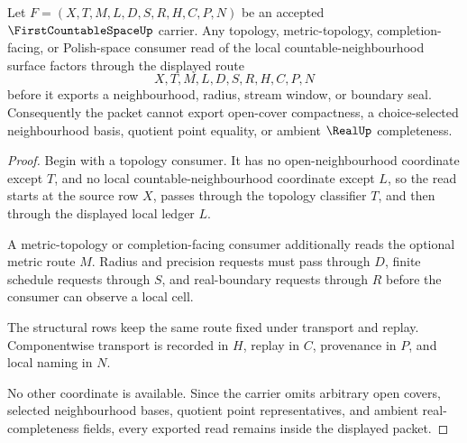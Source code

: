 \begin{theorem}
\label{thm:first-countable-space-nonescape}
Let $F=(X,T,M,L,D,S,R,H,C,P,N)$ be an accepted $\FirstCountableSpaceUp$ carrier. Any topology, metric-topology, completion-facing, or Polish-space consumer read of the local countable-neighbourhood surface factors through the displayed route
$$
X,T,M,L,D,S,R,H,C,P,N
$$
before it exports a neighbourhood, radius, stream window, or boundary seal. Consequently the packet cannot export open-cover compactness, a choice-selected neighbourhood basis, quotient point equality, or ambient $\RealUp$ completeness.
\end{theorem}
\begin{proof}
Begin with a topology consumer. It has no open-neighbourhood coordinate except $T$, and no local countable-neighbourhood coordinate except $L$, so the read starts at the source row $X$, passes through the topology classifier $T$, and then through the displayed local ledger $L$.

A metric-topology or completion-facing consumer additionally reads the optional metric route $M$. Radius and precision requests must pass through $D$, finite schedule requests through $S$, and real-boundary requests through $R$ before the consumer can observe a local cell.

The structural rows keep the same route fixed under transport and replay. Componentwise transport is recorded in $H$, replay in $C$, provenance in $P$, and local naming in $N$.

No other coordinate is available. Since the carrier omits arbitrary open covers, selected neighbourhood bases, quotient point representatives, and ambient real-completeness fields, every exported read remains inside the displayed packet.
\end{proof}


